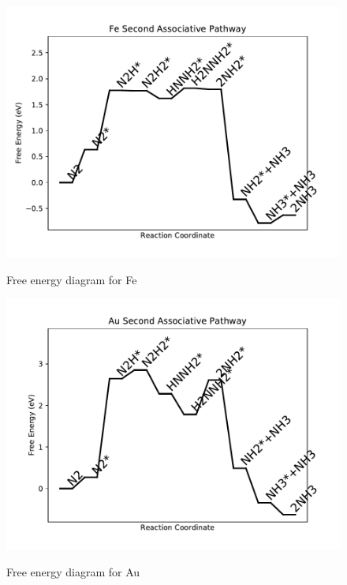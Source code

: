 \documentclass{article}
\begin{document}
\begin{figure}
\includegraphics[width=1\linewidth]{data/plots/Fe_associative_2.pdf}
\label{fig:Fe_associative_2}
\caption{Free energy diagram for Fe}
\end{figure}

\clearpage
\begin{figure}
\includegraphics[width=1\linewidth]{data/plots/Au_associative_2.pdf}
\label{fig:Au_associative_2}
\caption{Free energy diagram for Au}
\end{figure}
\end{document}
